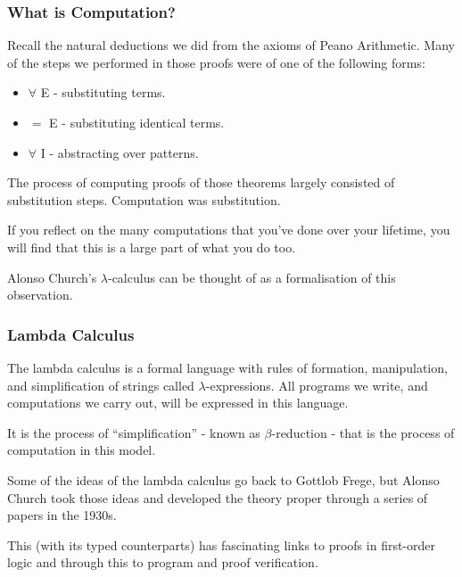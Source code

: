 \documentclass{beamer}
\begin{document}
\begin{frame}
	\frametitle{What is Computation?}

	Recall the natural deductions we did from the axioms of Peano Arithmetic. Many of the steps we performed in those proofs were of one of the following forms: 

		\begin{itemize}
			\item $\forall$ E - substituting terms.
			\item $=$ E - substituting identical terms.
			\item $\forall$ I - abstracting over patterns. 
		\end{itemize}

	The process of computing proofs of those theorems largely consisted of substitution steps. Computation was substitution. 

	If you reflect on the many computations that you've done over your lifetime, you will find that this is a large part of what you do too.

	Alonso Church's $\lambda$-calculus can be thought of as a formalisation of this observation. 


\end{frame}

\begin{frame}
	\frametitle{Lambda Calculus}

	The lambda calculus is a formal language with rules of formation, manipulation, and simplification of strings called $\lambda$-expressions. All programs we write, and computations we carry out, will be expressed in this language.

	It is the process of ``simplification'' - known as $\beta$-reduction - that is the process of computation in this model.

	Some of the ideas of the lambda calculus go back to Gottlob Frege, but Alonso Church took those ideas and developed the theory proper through a series of papers in the 1930s. 

	This (with its typed counterparts) has fascinating links to proofs in first-order logic and through this to program and proof verification.

\end{frame}
\end{document}
